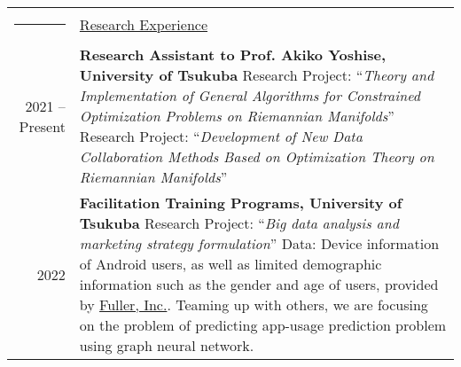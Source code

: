 \documentclass[11pt]{article}
\newcommand{\headingfont}{\LARGE \MakeUppercase }
\newenvironment{SectionTable}[1]{
	\renewcommand*{\arraystretch}{1.0}
	\setlength{\tabcolsep}{10pt}
	\begin{longtable}{Rp{5.7in}} 
		\rule{2.5cm}{4pt} 
		& \underline{#1} \\ %
	}
	{
	\end{longtable}\vspace{-.3cm}
}
\begin{document}
\begin{SectionTable}{\headingfont Research Experience}
	2021 -- Present & 
	\textbf{Research Assistant to Prof. Akiko Yoshise, University of Tsukuba} \newline
	Research Project: ``\textit{Theory and Implementation of General Algorithms for Constrained Optimization Problems on Riemannian Manifolds}'' \newline
	Research Project: ``\textit{Development of New Data Collaboration Methods Based on Optimization Theory on Riemannian Manifolds}'' \\
	
	2022 &
	\textbf{Facilitation Training Programs, University of Tsukuba}
	\newline
	Research Project: ``\textit{Big data analysis and marketing strategy formulation}''
	\newline
	Data: Device information of Android users, as well as limited demographic information such as the gender and age of users, provided by \href{https://en.fuller-inc.com/}{Fuller, Inc.}. \newline
	Teaming up with others, we are focusing on the problem of predicting app-usage prediction problem using graph neural network.
\end{SectionTable}
\end{document}
